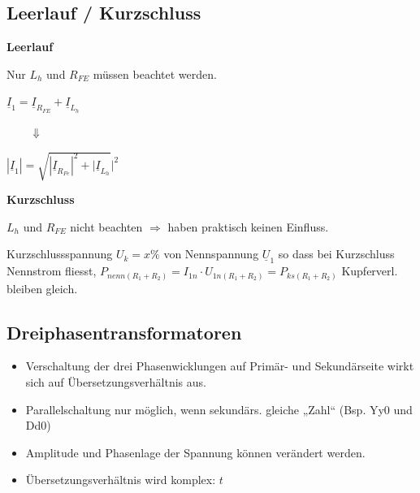 \subsection{Leerlauf / Kurzschluss}
    \begin{minipage}[t]{0.46\columnwidth}
        \textbf{Leerlauf}

        Nur $L_h$ und $R_{FE}$ müssen beachtet werden.

        $\boxed{\underline{I}_{1} = \underline{I}_{R_{FE}}+\underline{I}_{L_{h}}}$ 

        $\qquad \Downarrow$ 

        $\boxed{|\underline{I}_{1}| = \sqrt{|\underline{I}_{R_{Fe}}|^2+|\underline{I}_{L_{h}}}|^2}$
    \end{minipage}%
    \hfill
    \begin{minipage}[t]{0.52\columnwidth}
        \textbf{Kurzschluss}

        $L_h$ und $R_{FE}$ nicht beachten $\Rightarrow$ haben praktisch keinen Einfluss.
        
        Kurzschlussspannung $U_k = x\%$ von Nennspannung $\underline{U}_1$
        so dass bei Kurzschluss Nennstrom fliesst, $P_{nenn(R_1+R_2)}=I_{1n}\cdot U_{1n(R_1+R_2)}=P_{ks(R_1+R_2)}$ Kupferverl. bleiben gleich.
    \end{minipage}

\subsection{Dreiphasentransformatoren}
    \begin{itemize}
        \item Verschaltung der drei Phasenwicklungen auf Primär- und Sekundärseite wirkt sich auf Übersetzungsverhältnis aus.
        \item Parallelschaltung nur möglich, wenn sekundärs. gleiche „Zahl“ (Bsp. Yy0 und Dd0)
        \item Amplitude und Phasenlage der Spannung können verändert werden.
        \item Übersetzungsverhältnis wird komplex: \( t \)
    \end{itemize}

